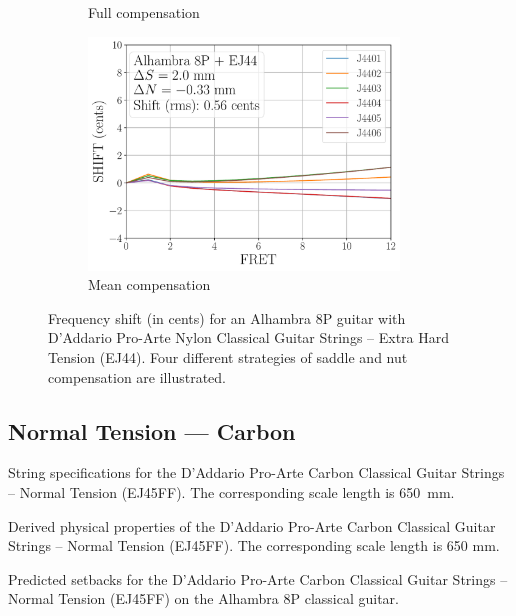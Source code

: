 \begin{figure}
\begin{subfigure}[b]{0.45\textwidth}
   \caption{Full compensation}
   \label{fig:shift_alhambra8p_ej44_full}
  \end{subfigure}
  \hspace{0.25in}
  \begin{subfigure}[b]{0.45\textwidth}
   \centering
   \includegraphics[width=3.25in]{../figures/shift_alhambra8p_ej44_mean}
   \caption{Mean compensation}
   \label{fig:shift_alhambra8p_ej44_mean}
  \end{subfigure}
  \caption{\label{fig:compensation_alhambra8p_ej44} Frequency shift (in cents) for an Alhambra 8P guitar with D'Addario Pro-Arte Nylon Classical Guitar Strings -- Extra Hard Tension (EJ44). Four different strategies of saddle and nut compensation are illustrated.}
 \end{figure}

\newpage
\subsection{Normal Tension --- Carbon}

\begin{table}[htbp]
  \centering
  \caption{\label{tbl:ej45ff_mks} String specifications for the D'Addario Pro-Arte Carbon Classical Guitar Strings -- Normal Tension (EJ45FF). The corresponding scale length is 650~mm.}
  
\end{table}%

\begin{table}[htbp]
  \centering
  \caption{\label{tbl:ej45ff_props} Derived physical properties of the D'Addario Pro-Arte Carbon Classical Guitar Strings -- Normal Tension (EJ45FF). The corresponding scale length is 650 mm.}
  
\end{table}%

\begin{table}[htbp]
  \centering
  \caption{\label{tbl:ej45ff_setbacks} Predicted setbacks for the D'Addario Pro-Arte Carbon Classical Guitar Strings -- Normal Tension (EJ45FF) on the Alhambra 8P classical guitar.}
  
\end{table}%

